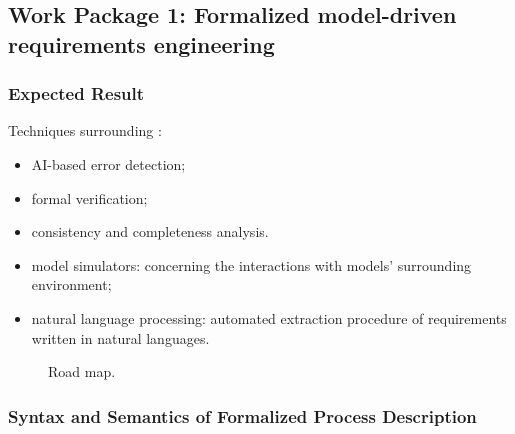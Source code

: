 \subsection{Work Package 1: Formalized model-driven requirements engineering}

\subsubsection{Expected Result}

Techniques surrounding :
\vspace{-.5cm}
\begin{itemize}
  \item AI-based error detection;
  \item formal verification;
  \item consistency and completeness analysis.
  \item model simulators: concerning the interactions with models' 
    surrounding environment;
  \item natural language processing: automated extraction procedure 
    of requirements written in natural languages.
\end{itemize}

\newcommand{\clanodetxt}[1]{\textbf{\footnotesize{#1}}}
\begin{figure}[H]
\centering  
{}
\caption{Road map.}
\end{figure}

\subsubsection{Syntax and Semantics of Formalized Process Description}

